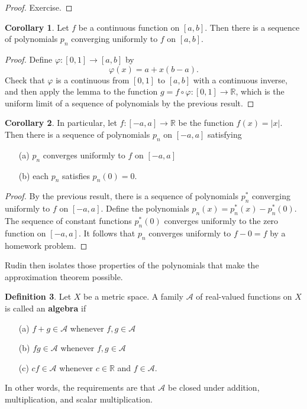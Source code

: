 \documentclass[12pt]{article}
\theoremstyle{definition}
\newtheorem{definition}{Definition}
\theoremstyle{theorem}
\newtheorem{corollary}[definition]{Corollary}
\begin{document}
\begin{proof}
Exercise. 
\end{proof}


\begin{corollary}
Let $f$ be a continuous function on $[a,b]$. Then there is a sequence of polynomials $p_n$ converging uniformly to $f$ on $[a,b]$. 
\end{corollary}

\begin{proof}
Define $\varphi : [0,1] \to [a,b]$ by 
\[
\varphi(x) = a + x(b-a).
\]
Check that $\varphi$ is a continuous from $[0,1]$ to $[a,b]$ with a continuous inverse, and then apply the lemma to the function $g = f \circ \varphi : [0,1] \to \mathbb{R}$, which is the uniform limit of a sequence of polynomials by the previous result. 
\end{proof}

\begin{corollary}
In particular, let $f : [-a,a] \to \mathbb{R}$ be the function $f(x) = |x|$. Then there is a sequence of polynomials $p_n$ on $[-a,a]$ satisfying 
\begin{enumerate}
\item[(a)] $p_n$ converges uniformly to $f$ on $[-a,a]$
\item[(b)] each $p_n$ satisfies $p_n(0) = 0$. 
\end{enumerate}
\end{corollary}

\begin{proof}
By the previous result, there is a sequence of polynomials $p_n^*$ converging uniformly to $f$ on $[-a,a]$. Define the polynomials $p_n(x) = p_n^*(x) - p_n^*(0)$. The sequence of constant functions $p_n^*(0)$ converges uniformly to the zero function on $[-a,a]$. It follows that $p_n$ converges uniformly to $f - 0 = f$ by a homework problem.  
\end{proof}

Rudin then isolates those properties of the polynomials that make the approximation theorem possible. 

\begin{definition}
Let $X$ be a metric space. A family $\mathcal{A}$ of real-valued functions on $X$ is called an \textbf{algebra} if 
\begin{enumerate}
\item[(a)] $f + g \in \mathcal{A}$ whenever $f,g \in \mathcal{A}$
\item[(b)] $fg \in \mathcal{A}$ whenever $f,g \in \mathcal{A}$
\item[(c)] $cf \in \mathcal{A}$ whenever $c \in \mathbb{R}$ and $f \in \mathcal{A}$.
\end{enumerate}
In other words, the requirements are that $\mathcal{A}$ be closed under addition, multiplication, and scalar multiplication. 
\end{definition}
\end{document}
